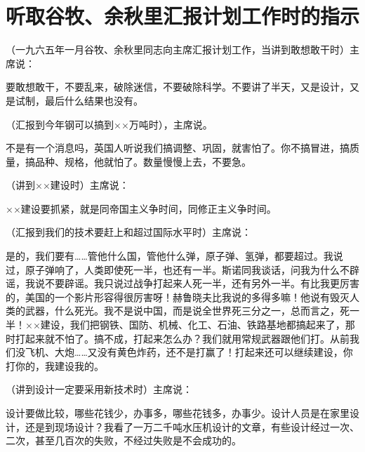 \section[听取谷牧、余秋里汇报计划工作时的指示（一九六五年一月）]{听取谷牧、余秋里汇报计划工作时的指示}


（一九六五年一月谷牧、余秋里同志向主席汇报计划工作，当讲到敢想敢干时）主席说：

要敢想敢干，不要乱来，破除迷信，不要破除科学。不要讲了半天，又是设计，又是试制，最后什么结果也没有。

（汇报到今年钢可以搞到××万吨时），主席说。

不是有一个消息吗，英国人听说我们搞调整、巩固，就害怕了。你不搞冒进，搞质量，搞品种、规格，他就怕了。数量慢慢上去，不要急。

（讲到××建设时）主席说：

××建设要抓紧，就是同帝国主义争时间，同修正主义争时间。

（汇报到我们的技术要赶上和超过国际水平时）主席说：

是的，我们要有……管他什么国，管他什么弹，原子弹、氢弹，都要超过。我说过，原子弹响了，人类即使死一半，也还有一半。斯诺同我谈话，问我为什么不辟谣，我说不要辟谣。我只说过战争打起来人死一半，还有另外一半。有比我更厉害的，美国的一个影片形容得很厉害呀！赫鲁晓夫比我说的多得多嘛！他说有毁灭人类的武器，什么死光。我不是说中国，而是说全世界死三分之一，总而言之，死一半！××建设，我们把钢铁、国防、机械、化工、石油、铁路基地都搞起来了，那时打起来就不怕了。搞不成，打起来怎么办？我们就用常规武器跟他们打。从前我们没飞机、大炮……又没有黄色炸药，还不是打赢了！打起来还可以继续建设，你打你的，我建设我的。

（讲到设计一定要采用新技术时）主席说：

设计要做比较，哪些花钱少，办事多，哪些花钱多，办事少。设计人员是在家里设计，还是到现场设计？我看了一万二千吨水压机设计的文章，有些设计经过一次、二次，甚至几百次的失败，不经过失败是不会成功的。

